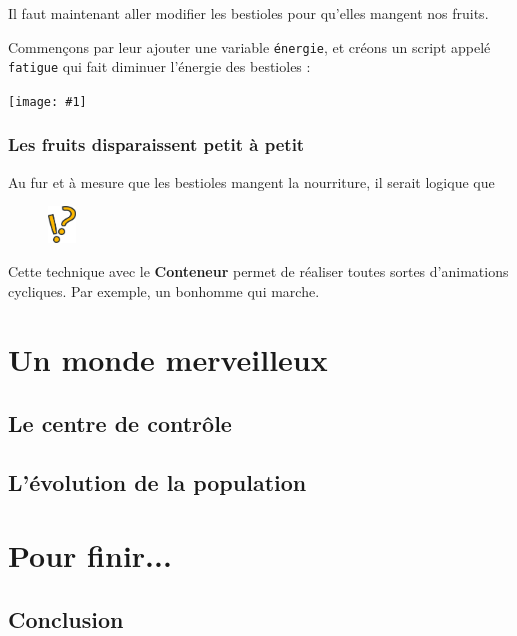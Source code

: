 \documentclass[a4paper,12pt]{book}
\newcommand{\capture}[1]
{
\begin{center}
	\texttt{[image: \#1]}
\end{center}
}
\newcommand{\code}[1]{\texttt{#1}}
\newcommand{\important}[1]{\textbf{#1}}
\newcommand{\astuce}[1]
{
\begin{framed}
\begin{figure}
	\vspace{-15pt}
	\includegraphics[width=2.0em]{astuce.png}
\end{figure}
#1
\end{framed}
}
\let\myMargin\marginpar
\renewcommand{\marginpar}[1]{\myMargin{{\scriptsize \sffamily #1}}}
\begin{document}
Il faut maintenant aller modifier les bestioles pour qu'elles mangent nos fruits.

Commençons par leur ajouter une variable \code{énergie}, et créons un script appelé \code{fatigue} qui fait diminuer l'énergie des bestioles :

\capture{55.png}


\subsection{Les fruits disparaissent petit à petit}

Au fur et à mesure que les bestioles mangent la nourriture, il serait logique que

\astuce{Cette technique avec le \important{Conteneur} permet de réaliser toutes
sortes d'animations cycliques. Par exemple, un bonhomme qui marche.}


\chapter{Un monde merveilleux}

\section{Le centre de contrôle}

\section{L'évolution de la population}

\chapter{Pour finir...}

\section{Conclusion}
\end{document}
